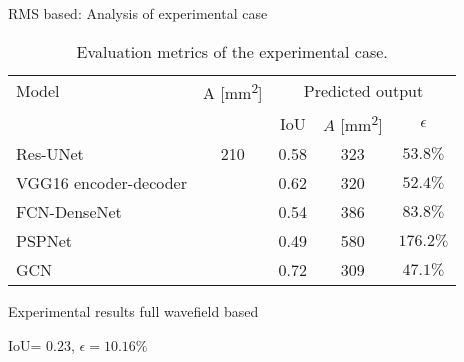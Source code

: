 \documentclass[10pt,aspectratio=169,dvipsnames]{beamer} %
\begin{document}
\begin{frame}{RMS based: Analysis of experimental case}
	\begin{table}[!ht]
		\centering
		\caption{Evaluation metrics of the experimental case.}
		\label{tab:rms_exp_case}
		\begin{tabular}{l@{\ }cccc}
			\toprule
			\multicolumn{1}{l}{Model} & \multicolumn{1}{c}{A [mm\textsuperscript{2}]} & \multicolumn{3}{c}{Predicted output} \\ 
			\cmidrule(lr){3-5} & & \multicolumn{1}{c}{IoU} & \multicolumn{1}{c}{\(\hat{A}\) [mm\textsuperscript{2}]} & \(\epsilon\) \\ \midrule
			Res-UNet & \multicolumn{1}{c}{210} & \multicolumn{1}{c}{0.58} & \multicolumn{1}{c}{323}  & \(53.8\%\) \\ 
			VGG16 encoder-decoder &  & \multicolumn{1}{c}{0.62} & \multicolumn{1}{c}{320} & \(52.4\%\) 
			\\ 
			FCN-DenseNet &  & \multicolumn{1}{c}{0.54} & \multicolumn{1}{c}{386} & \(83.8\%\) \\ 
			PSPNet &  & \multicolumn{1}{c}{0.49} & \multicolumn{1}{c}{580} & \(176.2\%\) 
			\\ 
			GCN &  & \multicolumn{1}{c}{0.72} & \multicolumn{1}{c}{309} & \(47.1\%\) 
			\\ 
			\bottomrule
		\end{tabular}		
	\end{table}
\end{frame}

\setcounter{subfigure}{0}
\begin{frame}{Experimental results full wavefield based}
		\centering
		\qquad
		
		IoU= $0.23$, $\epsilon=10.16\%$
\end{frame}
\end{document}
